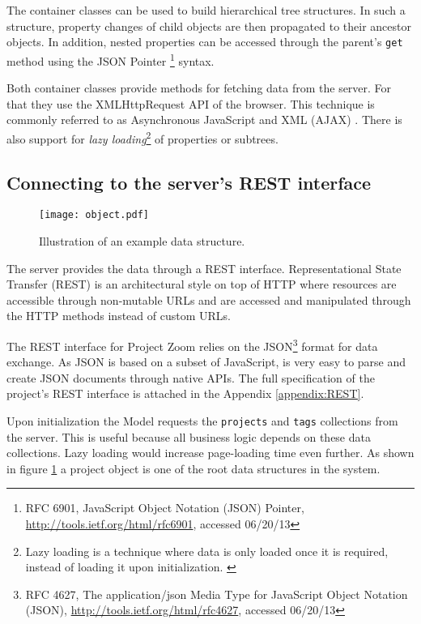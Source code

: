 The container classes can be used to build hierarchical tree structures. In such a structure, property changes of child objects are then propagated to their ancestor objects. In addition, nested properties can be accessed through the parent's \texttt{get} method using the JSON Pointer \footnote{RFC 6901, JavaScript Object Notation (JSON) Pointer, \url{http://tools.ietf.org/html/rfc6901}, accessed 06/20/13} syntax.

Both container classes provide methods for fetching data from the server. For that they use the XMLHttpRequest \cite{W3C_XHR} API of the browser. This technique is commonly referred to as Asynchronous JavaScript and XML (AJAX) \cite{Garrett_2005}. There is also support for \textit{lazy loading}\footnote{Lazy loading is a technique where data is only loaded once it is required, instead of loading it upon initialization. \cite{Fowler_2002}} of properties or subtrees. 
\subsection{Connecting to the server's REST interface}

\begin{figure}
\centering
\texttt{[image: object.pdf]}
\caption{Illustration of an example data structure.}
\label{fig:projectstruc}
\end{figure}

The server provides the data through a REST interface. Representational State Transfer (REST) is an architectural style on top of HTTP where resources are accessible through non-mutable URLs and are accessed and manipulated through the HTTP methods instead of custom URLs. \cite{Fielding_2000} 

The REST interface for Project Zoom relies on the JSON\footnote{RFC 4627,  The application/json Media Type for JavaScript Object Notation (JSON), \url{http://tools.ietf.org/html/rfc4627}, accessed 06/20/13} format for data exchange. As JSON is based on a subset of JavaScript, is very easy to parse and create JSON documents through native APIs. The full specification of the project's REST interface is attached in the Appendix \ref{appendix:REST}.

Upon initialization the Model requests the \texttt{projects} and \texttt{tags} collections from the server. This is useful because all business logic depends on these data collections. Lazy loading would increase page-loading time even further. As shown in figure \ref{fig:projectstruc} a project object is one of the root data structures in the system.


